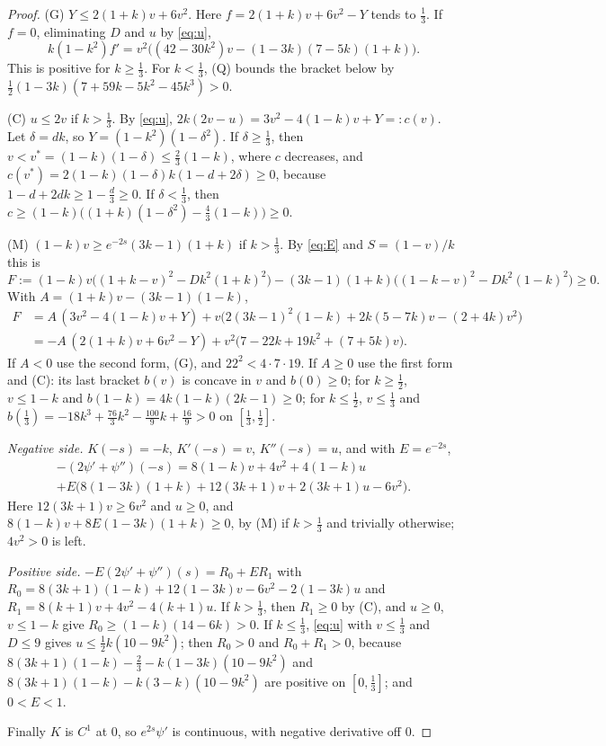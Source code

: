 \documentclass[11pt]{amsart}
\theoremstyle{definition}
\numberwithin{equation}{section}
\begin{document}
\begin{proof}
(G) $Y\le2(1+k)v+6v^2$. Here $f=2(1+k)v+6v^2-Y$ tends to $\frac13$. If $f=0$, eliminating $D$ and $u$ by \eqref{eq:u},
\[k(1-k^2)f'=v^2\big((42-30k^2)v-(1-3k)(7-5k)(1+k)\big).\]
This is positive for $k\ge\frac13$. For $k<\frac13$, (Q) bounds the bracket below by $\frac12(1-3k)(7+59k-5k^2-45k^3)>0$.

(C) $u\le2v$ if $k>\frac13$. By \eqref{eq:u}, $2k(2v-u)=3v^2-4(1-k)v+Y=:c(v)$. Let $\delta=dk$, so $Y=(1-k^2)(1-\delta^2)$. If $\delta\ge\frac13$, then $v<v^*=(1-k)(1-\delta)\le\frac23(1-k)$, where $c$ decreases, and
$c(v^*)=2(1-k)(1-\delta)k(1-d+2\delta)\ge0$, because $1-d+2dk\ge1-\frac d3\ge0$. If $\delta<\frac13$, then $c\ge(1-k)\big((1+k)(1-\delta^2)-\frac43(1-k)\big)\ge0$.

(M) $(1-k)v\ge e^{-2s}(3k-1)(1+k)$ if $k>\frac13$. By \eqref{eq:E} and $S=(1-v)/k$ this is
\[F:=(1-k)v\big((1+k-v)^2-Dk^2(1+k)^2\big)-(3k-1)(1+k)\big((1-k-v)^2-Dk^2(1-k)^2\big)\ge0 .\]
With $A=(1+k)v-(3k-1)(1-k)$,
\begin{align*}
F&=A\,(3v^2-4(1-k)v+Y)+v\big(2(3k-1)^2(1-k)+2k(5-7k)v-(2+4k)v^2\big)\\
&=-A\,(2(1+k)v+6v^2-Y)+v^2\big(7-22k+19k^2+(7+5k)v\big).
\end{align*}
If $A<0$ use the second form, (G), and $22^2<4\cdot7\cdot19$. If $A\ge0$ use the first form and (C): its last bracket $b(v)$ is concave in $v$ and $b(0)\ge0$; for $k\ge\frac12$, $v\le1-k$ and $b(1-k)=4k(1-k)(2k-1)\ge0$; for $k\le\frac12$, $v\le\frac13$ and
$b(\frac13)=-18k^3+\frac{76}3k^2-\frac{100}9k+\frac{16}9>0$ on $[\frac13,\frac12]$.

\emph{Negative side.} $K(-s)=-k$, $K'(-s)=v$, $K''(-s)=u$, and with $E=e^{-2s}$,
\begin{multline*}
-(2\psi'+\psi'')(-s)=8(1-k)v+4v^2+4(1-k)u\\+E\big(8(1-3k)(1+k)+12(3k+1)v+2(3k+1)u-6v^2\big).
\end{multline*}
Here $12(3k+1)v\ge6v^2$ and $u\ge0$, and $8(1-k)v+8E(1-3k)(1+k)\ge0$, by (M) if $k>\frac13$ and trivially otherwise; $4v^2>0$ is left.

\emph{Positive side.} $-E(2\psi'+\psi'')(s)=R_0+ER_1$ with $R_0=8(3k+1)(1-k)+12(1-3k)v-6v^2-2(1-3k)u$ and $R_1=8(k+1)v+4v^2-4(k+1)u$. If $k>\frac13$, then $R_1\ge0$ by (C), and $u\ge0$, $v\le1-k$ give $R_0\ge(1-k)(14-6k)>0$.
If $k\le\frac13$, \eqref{eq:u} with $v\le\frac13$ and $D\le9$ gives $u\le\frac12k(10-9k^2)$; then $R_0>0$ and $R_0+R_1>0$, because
$8(3k+1)(1-k)-\frac23-k(1-3k)(10-9k^2)$ and $8(3k+1)(1-k)-k(3-k)(10-9k^2)$ are positive on $[0,\frac13]$; and $0<E<1$.

Finally $K$ is $C^1$ at $0$, so $e^{2s}\psi'$ is continuous, with negative derivative off $0$.
\end{proof}
\end{document}

